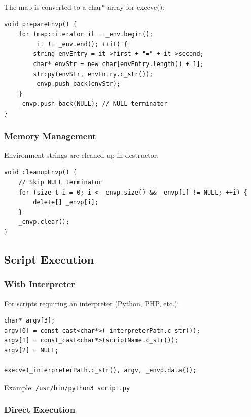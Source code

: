\documentclass[11pt,a4paper]{article}
\begin{document}
The map is converted to a char* array for execve():

\begin{lstlisting}[caption=Environment Array Creation]
void prepareEnvp() {
    for (map::iterator it = _env.begin();
         it != _env.end(); ++it) {
        string envEntry = it->first + "=" + it->second;
        char* envStr = new char[envEntry.length() + 1];
        strcpy(envStr, envEntry.c_str());
        _envp.push_back(envStr);
    }
    _envp.push_back(NULL); // NULL terminator
}
\end{lstlisting}

\subsubsection{Memory Management}

Environment strings are cleaned up in destructor:

\begin{lstlisting}[caption=Environment Cleanup]
void cleanupEnvp() {
    // Skip NULL terminator
    for (size_t i = 0; i < _envp.size() && _envp[i] != NULL; ++i) {
        delete[] _envp[i];
    }
    _envp.clear();
}
\end{lstlisting}

\subsection{Script Execution}

\subsubsection{With Interpreter}

For scripts requiring an interpreter (Python, PHP, etc.):

\begin{lstlisting}[caption=Execution with Interpreter]
char* argv[3];
argv[0] = const_cast<char*>(_interpreterPath.c_str());
argv[1] = const_cast<char*>(scriptName.c_str());
argv[2] = NULL;

execve(_interpreterPath.c_str(), argv, _envp.data());
\end{lstlisting}

Example: \texttt{/usr/bin/python3 script.py}

\subsubsection{Direct Execution}
\end{document}
